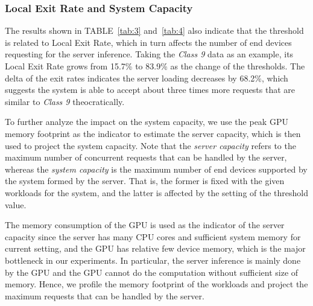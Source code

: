 \documentclass[format=acmsmall, review=false, screen=true]{acmart}
\def\tablename{TABLE}
\begin{document}
\subsubsection{Local Exit Rate and System Capacity}
The results shown in \tablename~\ref{tab:3} and~\ref{tab:4} also indicate that the threshold is related to Local Exit Rate, which in turn affects the number of end devices requesting for the server inference.
Taking the \emph{Class 9} data as an example, its Local Exit Rate grows from 15.7\% to 83.9\% as the change of the thresholds. The delta of the exit rates indicates the server loading decreases by 68.2\%, which suggests the system is able to accept about three times more requests that are similar to \emph{Class 9} theocratically.

To further analyze the impact on the system capacity, we use the peak GPU memory footprint as the indicator to estimate the server capacity, which is then used to project the system capacity. Note that the \emph{server capacity} refers to the maximum number of concurrent requests that can be handled by the server, whereas the \emph{system capacity} is the maximum number of end devices supported by the system formed by the server. That is, the former is fixed with the given workloads for the system, and the latter is affected by the setting of the threshold value.

The memory consumption of the GPU is used as the indicator of the server capacity since the server has many CPU cores and sufficient system memory for current setting, and the GPU has relative few device memory, which is the major bottleneck in our experiments. In particular, the server inference is mainly done by the GPU and the GPU cannot do the computation without sufficient size of memory. Hence, we profile the memory footprint of the workloads and project the maximum requests that can be handled by the server.

\end{document}
